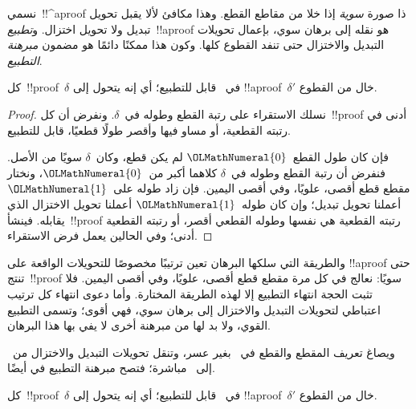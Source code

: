 \documentclass[../../../include/open-logic-section]{subfiles}
\begin{document}


نسمي~!!^a{proof} ذا صورة \emph{سوية} إذا خلا من مقاطع القطع. وهذا مكافئ
لألا يقبل تحويل تبديل ولا تحويل اختزال. و\emph{تطبيع}~!!a{proof} هو
نقله إلى برهان سوي، بإعمال تحويلات التبديل والاختزال حتى تنفد القطوع
كلها. وكون هذا ممكنًا دائمًا هو مضمون \emph{مبرهنة التطبيع}.

\begin{thm}
كل~!!{proof}~$\delta$ في~ قابل للتطبيع؛ أي إنه يتحول إلى
!!a{proof}~$\delta'$ خال من القطوع.
\end{thm}

\begin{proof}
  نسلك الاستقراء على رتبة القطع وطوله في~$\delta$. ونفرض أن كل~!!{proof}
  أدنى في رتبته القطعية، أو مساو فيها وأقصر طولًا قطعيًا، قابل للتطبيع.

  فإن كان طول القطع~$\OLMathNumeral{0}$ لم يكن قطع، وكان~$\delta$ سويًا من الأصل. فنفرض
  أن رتبة القطع وطوله في~$\delta$ كلاهما أكبر من~$\OLMathNumeral{0}$، ونختار مقطع قطع
  أقصى، علويًا، وفي أقصى اليمين. فإن زاد طوله على~$\OLMathNumeral{1}$ أعملنا تحويل تبديل؛
  وإن كان طوله~$\OLMathNumeral{1}$ أعملنا تحويل الاختزال الذي يقابله. فينشأ~!!{proof}
  رتبته القطعية هي نفسها وطوله القطعي أقصر، أو رتبته القطعية أدنى؛ وفي
  الحالين يعمل فرض الاستقراء.
\end{proof}

والطريقة التي سلكها البرهان تعين ترتيبًا مخصوصًا للتحويلات الواقعة على
!!a{proof} حتى تنتج~!!{proof} سويًا: نعالج في كل مرة مقطع قطع أقصى،
علويًا، وفي أقصى اليمين. فلا تثبت الحجة انتهاء التطبيع إلا لهذه الطريقة
المختارة. وأما دعوى انتهاء كل ترتيب اعتباطي لتحويلات التبديل والاختزال
إلى برهان سوي، فهي أقوى؛ وتسمى التطبيع القوي، ولا بد لها من مبرهنة أخرى
لا يفي بها هذا البرهان.

ويصاغ تعريف المقطع والقطع في~ بغير عسر، وتنقل تحويلات التبديل
والاختزال من~ إلى~ مباشرة؛ فتصح مبرهنة التطبيع في
 أيضًا.

\begin{thm}
كل~!!{proof}~$\delta$ في~ قابل للتطبيع؛ أي إنه يتحول إلى
!!a{proof}~$\delta'$ خال من القطوع.
\end{thm}
\end{document}
